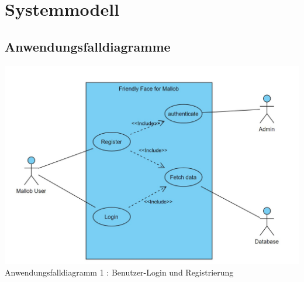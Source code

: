 \section{Systemmodell}

\subsection{Anwendungsfalldiagramme}

\begin{center}
    \includegraphics[scale=0.4]{images-interface/UsecaseDiagram_Login-Register.jpg}
    Anwendungsfalldiagramm 1 : Benutzer-Login und Registrierung
\end{center}